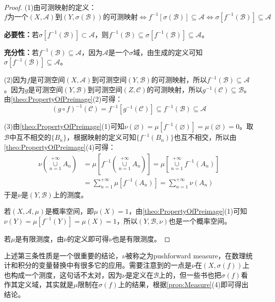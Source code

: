 \begin{proof}
	(1)由可测映射的定义：
	\begin{equation*}
		\text{$f$为一个$(X,\mathscr{A})$到$(Y,\sigma(\mathscr{B}))$的可测映射}
		\Leftrightarrow f^{-1}[\sigma(\mathscr{B})]\subseteq\mathscr{A}
		\Leftrightarrow
		\sigma[f^{-1}(\mathscr{B})]\subseteq\mathscr{A}
	\end{equation*}\par
	\textbf{必要性：}若$\sigma[f^{-1}(\mathscr{B})]\subset\mathscr{A}$，则$f^{-1}(\mathscr{B})\subseteq\sigma[f^{-1}(\mathscr{B})]\subseteq\mathscr{A}$。\par
	\textbf{充分性：}若$f^{-1}(\mathscr{B})\subseteq\mathscr{A}$，因为$\mathscr{A}$是一个$\sigma$域，由生成的定义可知$\sigma[f^{-1}(\mathscr{B})]\subseteq\mathscr{A}$。\par
	(2)因为$f$是可测空间$(X,\mathscr{A})$到可测空间$(Y,\mathscr{B})$的可测映射，所以$f^{-1}(\mathscr{B})\subseteq\mathscr{A}$。因为$g$是可测空间$(Y,\mathscr{B})$到可测空间$(Z,\mathscr{C})$的可测映射，所以$g^{-1}(\mathscr{C})\subseteq\mathscr{B}$。由\cref{theo:PropertyOfPreimage}(2)可得：
	\begin{equation*}
		(g\circ f)^{-1}(\mathscr{C})=f^{-1}[g^{-1}(\mathscr{C})]\subseteq f^{-1}(\mathscr{B})\subseteq\mathscr{A}
	\end{equation*}\par
	(3)由\cref{theo:PropertyOfPreimage}(1)可知$\nu(\varnothing)=\mu[f^{-1}(\varnothing)]=\mu(\varnothing)=0$。取$\mathscr{B}$中互不相交的$\{B_n\}$，根据映射的定义可知$\{f^{-1}(B_n)\}$也互不相交，所以由\cref{theo:PropertyOfPreimage}(4)可得：
	\begin{align*}
		\nu\left(\underset{n=1}{\overset{+\infty}{\cup}}A_n\right)&=\mu\left[f^{-1}\left(\underset{n=1}{\overset{+\infty}{\cup}}A_n\right)\right]=\mu\left[\underset{n=1}{\overset{+\infty}{\cup}}f^{-1}(A_n)\right] \\
		&=\sum_{n=1}^{+\infty}\mu[f^{-1}(A_n)]=\sum_{n=1}^{+\infty}\nu(A_n)
	\end{align*}
	于是$\nu$是$(Y,\mathscr{B})$上的测度。\par
	若$(X,\mathscr{A},\mu)$是概率空间，即$\mu(X)=1$，由\cref{theo:PropertyOfPreimage}(1)可知$\nu(Y)=\mu[f^{-1}(Y)]=\mu(X)=1$，所以$(Y,\mathscr{B},\nu)$也是一个概率空间。\par
	若$\mu$是有限测度，由$\nu$的定义即可得$\nu$也是有限测度。\par
\end{proof}
\begin{note}
	上述第三条性质是一个很重要的结论，$\nu$被称之为pushforward measure，在数理统计和积分的变量替换中有很多它的应用。需要注意到的一点是$\nu$在$(X,\sigma(f))$上也构成一个测度，这句话不太对，因为$\nu$是定义在$\mathscr{B}$上的，但一些书也把$\sigma(f)$看作其定义域，其实就是$\mu$限制在$\sigma(f)$上的结果，根据\cref{prop:Measure}(4)即可得出结论。
\end{note}

